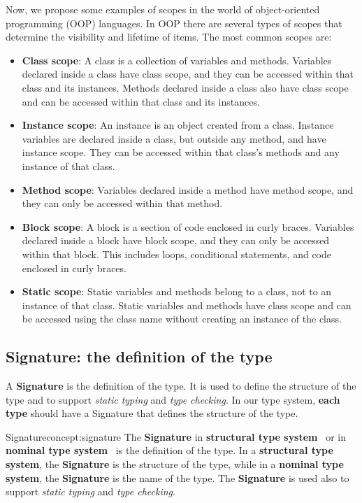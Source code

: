 Now, we propose some examples of scopes in the world of object-oriented programming (OOP) languages.
In OOP there are several types of scopes that determine the visibility and lifetime of items. The most common scopes are:
\begin{itemize}
    \item \textbf{Class scope}:  A class is a collection of variables and methods. Variables declared inside a class have class scope, and they can be accessed within that class and its instances. Methods declared inside a class also have class scope and can be accessed within that class and its instances.
    \item \textbf{Instance scope}: An instance is an object created from a class. Instance variables are declared inside a class, but outside any method, and have instance scope. They can be accessed within that class’s methods and any instance of that class.
    \item \textbf{Method scope}: Variables declared inside a method have method scope, and they can only be accessed within that method.
    \item \textbf{Block scope}: A block is a section of code enclosed in curly braces. Variables declared inside a block have block scope, and they can only be accessed within that block. This includes loops, conditional statements, and code enclosed in curly braces.
    \item \textbf{Static scope}: Static variables and methods belong to a class, not to an instance of that class. Static variables and methods have class scope and can be accessed using the class name without creating an instance of the class.
\end{itemize}

\subsection{Signature: the definition of the type}\label{subsec:concept:SignatureTheDefinitionOfTheType}

A \textbf{Signature} is the definition of the type. It is used to define the structure of the type and to support \textit{static typing} and \textit{type checking}. In our type system, \textbf{each type} should have a Signature that defines the structure of the type.

\begin{mydefinition}{Signature}{concept:signature}
    The \textbf{Signature} in \textbf{structural type system}~\cite{Cardelli88, Cook89} or in \textbf{nominal type system}~\cite{Pierce02} is the definition of the type. In a \textbf{structural type system}, the \textbf{Signature} is the structure of the type, while in a \textbf{nominal type system}, the \textbf{Signature} is the name of the type. The \textbf{Signature} is used also to support \textit{static typing} and \textit{type checking}.
\end{mydefinition}

